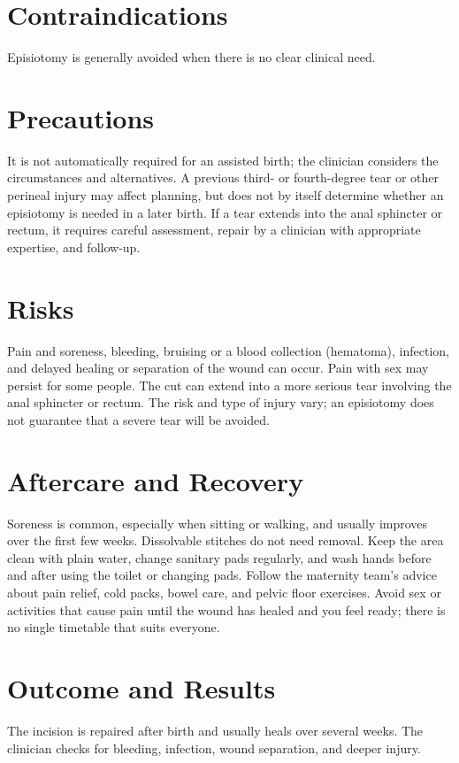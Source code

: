 \section*{Contraindications}
Episiotomy is generally avoided when there is no clear clinical need.

\section*{Precautions}
It is not automatically required for an assisted birth; the clinician considers the circumstances and alternatives. A previous third- or fourth-degree tear or other perineal injury may affect planning, but does not by itself determine whether an episiotomy is needed in a later birth. If a tear extends into the anal sphincter or rectum, it requires careful assessment, repair by a clinician with appropriate expertise, and follow-up.

\section*{Risks}
Pain and soreness, bleeding, bruising or a blood collection (hematoma), infection, and delayed healing or separation of the wound can occur. Pain with sex may persist for some people. The cut can extend into a more serious tear involving the anal sphincter or rectum. The risk and type of injury vary; an episiotomy does not guarantee that a severe tear will be avoided.

\section*{Aftercare and Recovery}
Soreness is common, especially when sitting or walking, and usually improves over the first few weeks. Dissolvable stitches do not need removal. Keep the area clean with plain water, change sanitary pads regularly, and wash hands before and after using the toilet or changing pads. Follow the maternity team's advice about pain relief, cold packs, bowel care, and pelvic floor exercises. Avoid sex or activities that cause pain until the wound has healed and you feel ready; there is no single timetable that suits everyone.

\section*{Outcome and Results}
The incision is repaired after birth and usually heals over several weeks. The clinician checks for bleeding, infection, wound separation, and deeper injury.

